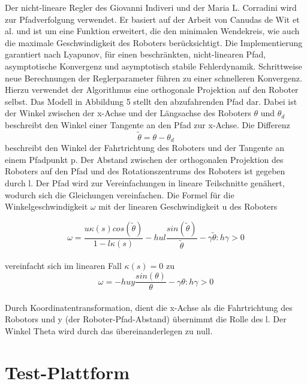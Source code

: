 \documentclass[11pt,a4paper]{article}
\begin{document}
{	Der nicht-lineare Regler des Giovanni Indiveri und der Maria L. Corradini\cite{Giovanni} wird zur Pfadverfolgung verwendet. Er basiert auf der Arbeit von Canudas de Wit et al. \cite{Canudas} und ist um eine Funktion erweitert, die den  minimalen Wendekreis, wie auch die maximale Geschwindigkeit des Roboters ber\"ucksichtigt. Die Implementierung garantiert nach Lyapunov, f\"ur einen beschr\"ankten, nicht-linearen Pfad, asymptotische Konvergenz und asymptotisch stabile Fehlerdynamik. Schrittweise neue Berechnungen der Reglerparameter f\"uhren zu einer schnelleren Konvergenz. Hierzu verwendet der Algorithmus eine orthogonale Projektion auf den Roboter selbst. Das Modell in Abbildung 5 stellt den abzufahrenden Pfad dar. Dabei ist der Winkel zwischen der x-Achse und der L\"angsachse des Roboters $\theta$ und $\theta_{d}$
beschreibt den Winkel einer Tangente an den Pfad zur 
x-Achse. Die Differenz 
\begin{equation}
\tilde{\theta} = \theta -\theta_{d}
\end{equation}
beschreibt den Winkel der Fahrtrichtung des Roboters und der Tangente an einem Pfadpunkt p. Der Abstand zwischen der orthogonalen Projektion des Roboters auf den Pfad und des Rotationszentrums des Roboters ist gegeben durch l.
Der Pfad wird zur Vereinfachungen in lineare Teilschnitte gen\"ahert, wodurch sich die Gleichungen vereinfachen. Die Formel f\"ur die Winkelgeschwindigkeit $\omega$ mit der linearen Geschwindigkeit u des Roboters


\begin{equation}
\omega=  \frac{u \kappa(s) cos(\tilde{\theta})}{1-l \kappa(s)}-h u l  \frac{sin(\tilde{\theta})}{\tilde{\theta}}-\gamma\tilde{\theta} :h\gamma > 0
\end{equation}\\

vereinfacht sich im linearen Fall $\kappa(s)=0$ zu \\

\begin{equation}
\omega= -h u y  \frac{sin(\theta)}{\theta}-\gamma\theta :h\gamma > 0
\end{equation}\\



	Durch Koordinatentransformation, dient die x-Achse als die Fahrtrichtung des Robotors  und y (der Roboter-Pfad-Abstand) \"ubernimmt die Rolle des l. Der Winkel Theta wird durch das \"ubereinanderlegen zu null.


\section{Test-Plattform}
}
\end{document}
